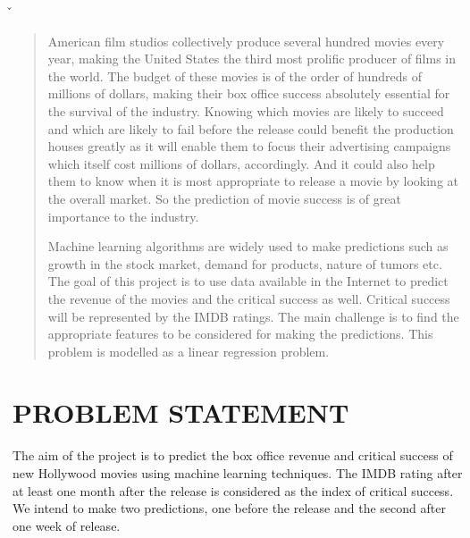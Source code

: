 \v
\begin{abstract}

 American film studios collectively produce several hundred movies every year, making the United States the third most prolific producer of films in the world. The budget of these movies is of the order of hundreds of millions of dollars, making their box office success absolutely essential for the survival of the industry. Knowing which movies are likely to succeed and which are likely to fail before the release could benefit the production houses greatly as it will enable them to focus their advertising campaigns which itself cost millions of dollars, accordingly. And it could also help them to know when it is most appropriate to release a movie by looking at the overall market. So the prediction of movie success is of great importance to the industry.

Machine learning algorithms are widely used to make predictions such as growth in the stock market, demand for products, nature of tumors etc. The goal of this project is to use data available in the Internet to predict the revenue of the movies and the critical success as well. Critical success will be represented by the IMDB ratings. The main challenge is to find the appropriate features to be considered for making the predictions. This problem is modelled as a linear regression problem.

\end{abstract}
\clearpage
\chapter*{PROBLEM STATEMENT}
The aim of the project is to predict the box office revenue and critical success of new Hollywood movies using machine learning techniques. The IMDB rating after at least one month after the release is considered as the index of critical success. We intend to make two predictions, one before the release and the second after one week of release. 
\clearpage
{}
\tableofcontents
\newpage
{}

